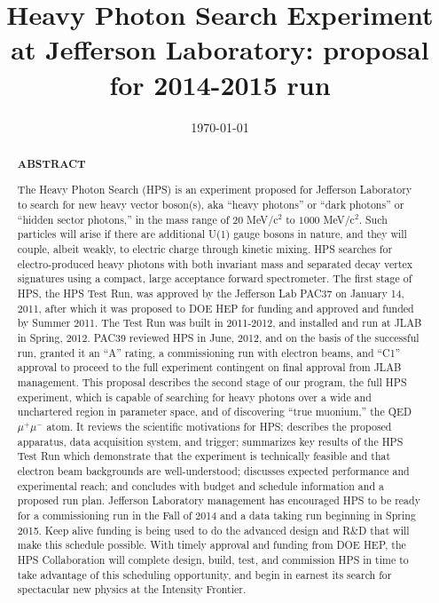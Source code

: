 \documentclass[prc,12pt,nofootinbib]{revtex4}
\begin{document}

\title{\bf\large{Heavy Photon Search Experiment at Jefferson Laboratory: proposal for 2014-2015 run}}


\date{\today}

\begin{abstract}
\clearpage
\begin{centerline}
{\bf {\large ABSTRACT}}
\vspace{0.5cm}
\end{centerline}
\begin{singlespace}

The Heavy Photon Search (HPS) is an experiment proposed for Jefferson Laboratory to search for new heavy vector boson(s), aka ``heavy photons'' or ``dark photons'' or ``hidden sector photons,'' in the mass range of $20$ MeV/c$^2$ to $1000$ MeV/c$^2$. Such particles will arise if there are additional U(1) gauge bosons in nature, and they will couple, albeit weakly, to electric charge through kinetic mixing. HPS searches for  electro-produced heavy photons with both invariant mass and separated decay vertex signatures using a compact, large acceptance forward spectrometer. The first stage of HPS, the HPS Test Run, was approved by the Jefferson Lab PAC37 on January 14, 2011, after which it was proposed to DOE HEP for funding and approved and funded by Summer 2011. The Test Run was built in 2011-2012, and installed and run at JLAB in Spring, 2012.  PAC39 reviewed HPS in June, 2012, and on the basis of the successful run, granted it an ``A'' rating, a commissioning run with electron beams, and ``C1'' approval to proceed to the full experiment contingent on final approval from JLAB management. This proposal describes the second stage of our program, the full HPS experiment, which is capable of searching for heavy photons over a wide and unchartered region in parameter space, and  of discovering ``true muonium,'' the QED $\mu^+\mu^-$ atom. It reviews the scientific motivations for HPS; describes the proposed apparatus, data acquisition system, and trigger; summarizes key results of the HPS Test Run which demonstrate that the experiment is technically feasible and that electron beam backgrounds are well-understood; discusses expected performance and experimental reach; and concludes with budget and schedule information and a proposed run plan.  Jefferson Laboratory management has encouraged HPS to be ready for a commissioning run in the Fall of 2014 and a data taking run beginning in Spring 2015. Keep alive funding is being used to do the advanced design and R\&D that will make this schedule possible.  With timely approval and funding from DOE HEP,  the HPS Collaboration will complete design, build, test, and commission HPS in time to take advantage of this scheduling opportunity, and begin in earnest its search for spectacular new physics at the Intensity Frontier.
   
\end{singlespace}
\end{abstract}
\end{document}
